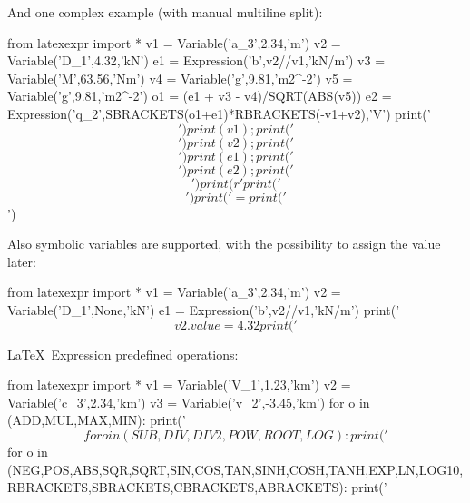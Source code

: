 \documentclass{report}
\begin{document}
And one complex example (with manual multiline split):
\begin{python}
	from latexexpr import *
	v1 = Variable('a_3',2.34,'m')
	v2 = Variable('D_1',4.32,'kN')
	e1 = Expression('b',v2//v1,'kN/m')
	v3 = Variable('M',63.56,'Nm')
	v4 = Variable('g',9.81,'m2^{-2}')
	v5 = Variable('g',9.81,'m2^{-2}')
	o1 = (e1 + v3 - v4)/SQRT(ABS(v5))
	e2 = Expression('q_2',SBRACKETS(o1+e1)*RBRACKETS(-v1+v2),'V')
	print('$$')
	print(v1); print('$$\n$$')
	print(v2); print('$$\n$$')
	print(e1); print('$$\n$$')
	print(e2); print('$$\n$$')
	print(r'%
	print('$$\n$$')
	print('= %
	print('$$')
\end{python}

Also symbolic variables are supported,
with the possibility to assign the value later:
\begin{python}
	from latexexpr import *
	v1 = Variable('a_3',2.34,'m')
	v2 = Variable('D_1',None,'kN')
	e1 = Expression('b',v2//v1,'kN/m')
	print('$$ %
	v2.value = 4.32
	print('$$ %
\end{python}


\LaTeX\ Expression predefined operations:
\begin{python}
	from latexexpr import *
	v1 = Variable('V_1',1.23,'km')
	v2 = Variable('c_3',2.34,'km')
	v3 = Variable('v_2',-3.45,'km')
	for o in (ADD,MUL,MAX,MIN):
	   print('$$ %
	for o in (SUB,DIV,DIV2,POW,ROOT,LOG):
	   print('$$ %
	for o in (NEG,POS,ABS,SQR,SQRT,SIN,COS,TAN,SINH,COSH,TANH,EXP,LN,LOG10,RBRACKETS,SBRACKETS,CBRACKETS,ABRACKETS):
	   print('$$ %
\end{python}
\end{document}

